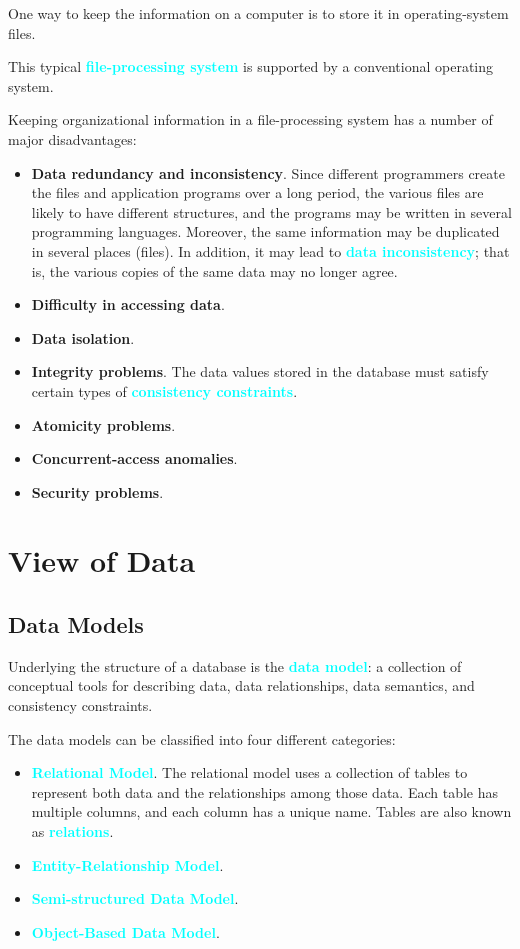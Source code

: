 \documentclass{Beautybook-EN}
\newcommand{\textcy}[1]{\textbf{\textcolor{cyan}{#1}}}
\begin{document}
One way to keep the information on a computer is to store it in operating-system files.

This typical \textcy{file-processing system} is supported by a conventional operating system.

Keeping organizational information in a file-processing system has a number of major disadvantages:
\begin{itemize}
    \item\textbf{Data redundancy and inconsistency}. Since different programmers create the files and application programs over a long period, the various files are likely to have different structures, and the programs may be written in several programming languages. Moreover, the same information may be duplicated in several places (files). In addition, it may lead to \textcy{data inconsistency}; that is, the various copies of the same data may no longer agree.
    \item\textbf{Difficulty in accessing data}.
    \item\textbf{Data isolation}.
    \item\textbf{Integrity problems}. The data values stored in the database must satisfy certain types of \textcy{consistency constraints}.
    \item\textbf{Atomicity problems}.
    \item\textbf{Concurrent-access anomalies}.
    \item\textbf{Security problems}.
\end{itemize}

\section{View of Data}
\subsection{Data Models}

Underlying the structure of a database is the \textcy{data model}: a collection of conceptual tools for describing data, data relationships, data semantics, and consistency constraints.

The data models can be classified into four different categories:
\begin{itemize}
    \item\textcy{Relational Model}. The relational model uses a collection of tables to represent both data and the relationships among those data. Each table has multiple columns, and each column has a unique name. Tables are also known as \textcy{relations}.
    \item\textcy{Entity-Relationship Model}.
    \item\textcy{Semi-structured Data Model}.
    \item\textcy{Object-Based Data Model}.
\end{itemize}
\end{document}

